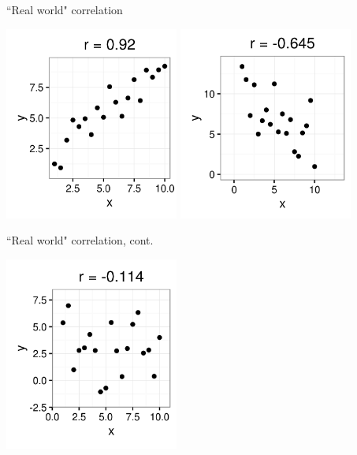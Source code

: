 \documentclass[xcolor=table, aspectratio=169, bigger]{beamer}
\begin{document}
\begin{frame}{``Real world" correlation}

{\centering
\includegraphics[width=2.25in]{../images/ch10_cor_pos3}
\pause\includegraphics[width=2.25in]{../images/ch10_cor_neg3}
\par}
\end{frame}

\begin{frame}{``Real world" correlation, cont.}

{\centering
\includegraphics[width=2.25in]{../images/ch10_cor_zero2}
\par}
\end{frame}
\end{document}
